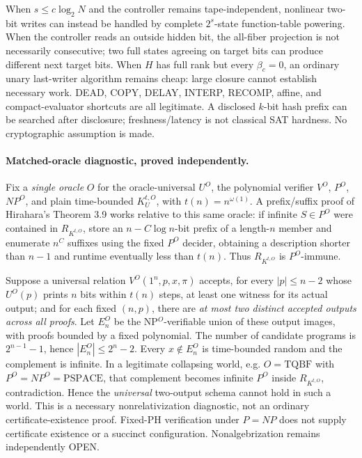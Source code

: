 \documentclass[11pt]{article}
\begin{document}
When $s\le c\log_2 N$ and the controller remains tape-independent,
nonlinear two-bit writes can instead be handled by complete
$2^s$-state function-table powering. When the controller reads
an outside hidden bit, the all-fiber projection is not necessarily
consecutive; two full states agreeing on target bits can
produce different next target bits. When $H$ has full rank but
every $\beta_c=0$, an ordinary unary last-writer algorithm remains
cheap: large closure cannot establish necessary work. DEAD, COPY,
DELAY, INTERP, RECOMP, affine, and compact-evaluator shortcuts are
all legitimate. A disclosed $k$-bit hash prefix can be searched
after disclosure; freshness/latency is not classical SAT hardness.
No cryptographic assumption is made.

\paragraph{Matched-oracle diagnostic, proved independently.}
Fix a \emph{single oracle} $O$ for the oracle-universal $U^O$,
the polynomial verifier $V^O$, $P^O$, $NP^O$, and plain
time-bounded $K_U^{t,O}$, with $t(n)=n^{\omega(1)}$.
A prefix/suffix proof of Hirahara's Theorem 3.9 works relative
to this same oracle: if infinite $S\in P^O$ were contained
in $R_{K^{t,O}}$, store an $n-C\log n$-bit prefix
of a length-$n$ member and enumerate $n^C$ suffixes
using the fixed $P^O$ decider, obtaining a description shorter
than $n-1$ and runtime eventually less than $t(n)$.
Thus $R_{K^{t,O}}$ is $P^O$-immune.

Suppose a universal relation $V^O(1^n,p,x,\pi)$ accepts,
for every $|p|\le n-2$ whose $U^O(p)$ prints $n$ bits within
$t(n)$ steps, at least one witness for its actual output; and
for each fixed $(n,p)$, there are \emph{at most two distinct
accepted outputs across all proofs}. Let $E_n^O$ be the
NP$^O$-verifiable union of these output images, with proofs
bounded by a fixed polynomial. The number of candidate programs
is $2^{n-1}-1$, hence $|E_n^O|\le2^n-2$.
Every $x\notin E_n^O$ is time-bounded random and the complement
is infinite. In a legitimate collapsing world, e.g.
$O=\mathrm{TQBF}$ with $P^O=NP^O=\mathrm{PSPACE}$,
that complement becomes infinite $P^O$ inside
$R_{K^{t,O}}$, contradiction. Hence the \emph{universal}
two-output schema cannot hold in such a world.
This is a necessary nonrelativization diagnostic, not an
ordinary certificate-existence proof. Fixed-PH verification
under $P=NP$ does not supply certificate existence or a
succinct configuration. Nonalgebrization remains independently OPEN.
\end{document}
